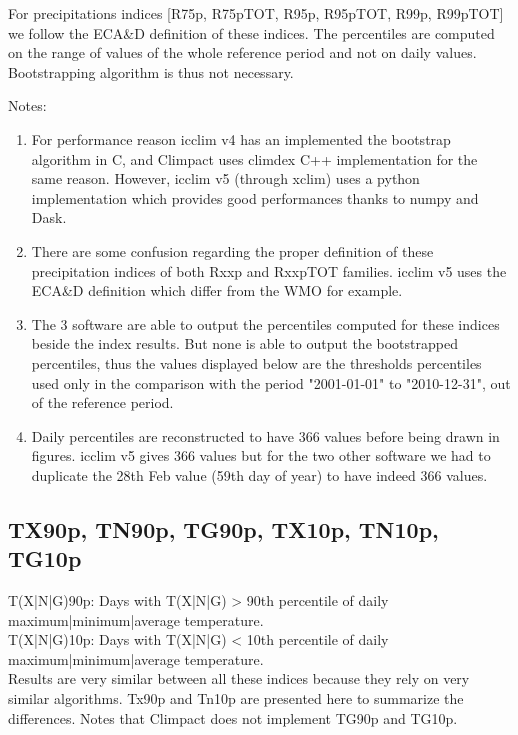 \documentclass[a4paper,11pt]{article}
\begin{document}
        For precipitations indices [R75p, R75pTOT, R95p, R95pTOT, R99p, R99pTOT] we follow the ECA\&D definition of these indices.
        The percentiles are computed on the range of values of the whole reference period and not on daily values.
        Bootstrapping algorithm is thus not necessary.

        Notes:
        \begin{enumerate}
            \item For performance reason icclim v4 has an implemented the bootstrap algorithm in C, and Climpact uses climdex C++ implementation for the same reason. However, icclim v5 (through xclim) uses a python implementation which provides good performances thanks to numpy and Dask.
            \item There are some confusion regarding the proper definition of these precipitation indices of both Rxxp and RxxpTOT families. icclim v5 uses the ECA\&D definition which differ from the WMO for example.
            \item The 3 software are able to output the percentiles computed for these indices beside the index results. But none is able to output the bootstrapped percentiles, thus the values displayed below are the thresholds percentiles used only in the comparison with the period "2001-01-01" to "2010-12-31", out of the reference period.
            \item Daily percentiles are reconstructed to have 366 values before being drawn in figures. icclim v5 gives 366 values but for the two other software we had to duplicate the 28th Feb value (59th day of year) to have indeed 366 values.
        \end{enumerate}

        \subsection{TX90p, TN90p, TG90p, TX10p, TN10p, TG10p}
            T(X|N|G)90p: Days with T(X|N|G) > 90th percentile of daily maximum|minimum|average temperature.\\
            T(X|N|G)10p: Days with T(X|N|G) < 10th percentile of daily maximum|minimum|average temperature.\\

            Results are very similar between all these indices because they rely on very similar algorithms. 
            Tx90p and Tn10p are presented here to summarize the differences.
            Notes that Climpact does not implement TG90p and TG10p.
\end{document}
